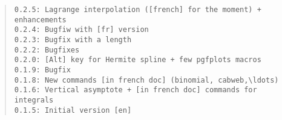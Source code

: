 \documentclass[11pt,a4paper]{ltxdoc}
\begin{document}
\begin{quote}
\begin{verbatim}
0.2.5: Lagrange interpolation ([french] for the moment) + enhancements
0.2.4: Bugfiw with [fr] version
0.2.3: Bugfix with a length
0.2.2: Bugfixes
0.2.0: [Alt] key for Hermite spline + few pgfplots macros
0.1.9: Bugfix
0.1.8: New commands [in french doc] (binomial, cabweb,\ldots)
0.1.6: Vertical asymptote + [in french doc] commands for integrals
0.1.5: Initial version [en]
\end{verbatim}
\end{quote}
\end{document}
